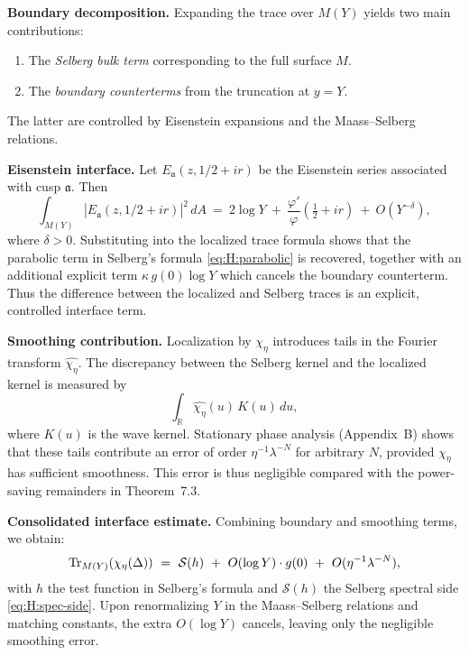 \medskip
\noindent\textbf{Boundary decomposition.}
Expanding the trace over $M(Y)$ yields two main contributions:
\begin{enumerate}
  \item The \emph{Selberg bulk term} corresponding to the full surface $M$.
  \item The \emph{boundary counterterms} from the truncation at $y=Y$.
\end{enumerate}
The latter are controlled by Eisenstein expansions and the Maass–Selberg relations.

\medskip
\noindent\textbf{Eisenstein interface.}
Let $E_\mathfrak a(z,1/2+ir)$ be the Eisenstein series associated with cusp $\mathfrak a$.
Then
\[
\int_{M(Y)} |E_\mathfrak a(z,1/2+ir)|^2\,dA
\ =\ 2\log Y\ +\ \frac{\varphi'}{\varphi}\!\left(\tfrac12+ir\right)\ +\ O(Y^{-\delta}),
\]
where $\delta>0$. Substituting into the localized trace formula shows that the parabolic
term in Selberg’s formula \eqref{eq:H:parabolic} is recovered, together with an additional
explicit term $\kappa\,g(0)\log Y$ which cancels the boundary counterterm. Thus the difference
between the localized and Selberg traces is an explicit, controlled interface term.

\medskip
\noindent\textbf{Smoothing contribution.}
Localization by $\chi_\eta$ introduces tails in the Fourier transform $\widehat{\chi_\eta}$.
The discrepancy between the Selberg kernel and the localized kernel is measured by
\[
\int_{\mathbb R}\widehat{\chi_\eta}(u)\,K(u)\,du,
\]
where $K(u)$ is the wave kernel. Stationary phase analysis (Appendix~B) shows that these tails
contribute an error of order $\eta^{-1}\lambda^{-N}$ for arbitrary $N$, provided $\chi_\eta$
has sufficient smoothness. This error is thus negligible compared with the power-saving 
remainders in Theorem~7.3.

\medskip
\noindent\textbf{Consolidated interface estimate.}
Combining boundary and smoothing terms, we obtain:
\[
\Tr_{M(Y)}(\chi_\eta(\Delta))\ =\ \mathcal S(h)\ +\ O(\log Y)\cdot g(0)\ +\ O(\eta^{-1}\lambda^{-N}),
\]
with $h$ the test function in Selberg’s formula and $\mathcal S(h)$ the Selberg spectral side
\eqref{eq:H:spec-side}. Upon renormalizing $Y$ in the Maass–Selberg relations and matching
constants, the extra $O(\log Y)$ cancels, leaving only the negligible smoothing error.

